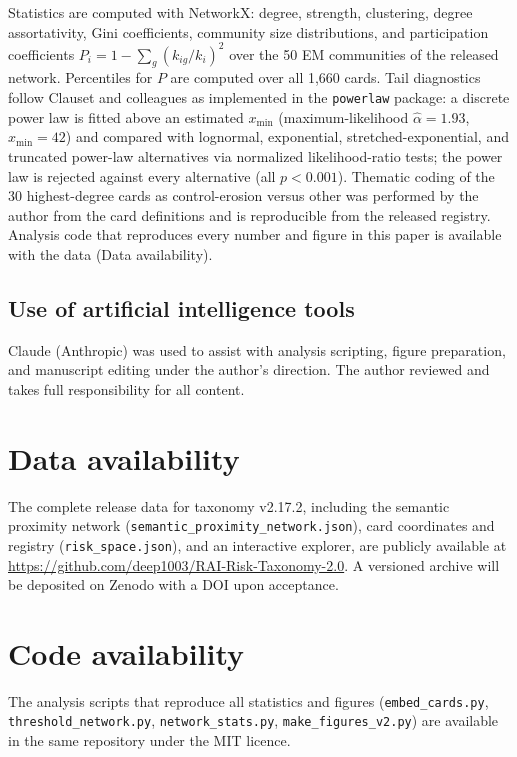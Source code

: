 \documentclass[fleqn,10pt]{wlscirep}
\begin{document}
Statistics are computed with NetworkX: degree, strength, clustering, degree
assortativity, Gini coefficients, community size distributions, and
participation coefficients $P_i = 1-\sum_g (k_{ig}/k_i)^2$ over the 50 EM
communities\cite{guimera2005} of the released network. Percentiles for $P$
are computed over all 1,660 cards. Tail diagnostics follow Clauset and
colleagues\cite{clauset2009} as implemented in the \texttt{powerlaw}
package: a discrete power law is fitted above an estimated $x_{\min}$
(maximum-likelihood $\hat{\alpha}=1.93$, $x_{\min}=42$) and compared with
lognormal, exponential, stretched-exponential, and truncated power-law
alternatives via normalized likelihood-ratio tests; the power law is
rejected against every alternative (all $p<0.001$). Thematic coding of the
30 highest-degree cards as control-erosion versus other was performed by
the author from the card definitions and is reproducible from the released
registry. Analysis code that reproduces every number and figure in this
paper is available with the data (Data availability).

\subsection*{Use of artificial intelligence tools}

Claude (Anthropic) was used to assist with analysis scripting, figure
preparation, and manuscript editing under the author's direction. The author
reviewed and takes full responsibility for all content.

\section*{Data availability}
The complete release data for taxonomy v2.17.2, including the semantic
proximity network (\texttt{semantic\_proximity\_network.json}), card
coordinates and registry (\texttt{risk\_space.json}), and an interactive
explorer, are publicly available at
\url{https://github.com/deep1003/RAI-Risk-Taxonomy-2.0}. A versioned archive
will be deposited on Zenodo with a DOI upon acceptance.

\section*{Code availability}
The analysis scripts that reproduce all statistics and figures
(\texttt{embed\_cards.py}, \texttt{threshold\_network.py},
\texttt{network\_stats.py}, \texttt{make\_figures\_v2.py}) are available in
the same repository under the MIT licence.
\end{document}
